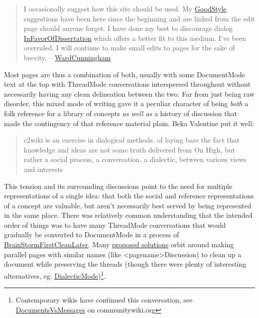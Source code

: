 \documentclass[10pt]{article}
\begin{document}
\begin{multicols}{2}
\begin{quote}
I occasionally suggest how this site should be used. My
\href{http://wiki.c2.com/?GoodStyle}{GoodStyle} suggestions have been
here since the beginning and are linked from the edit page should anyone
forget. I have done my best to discourage dialog
\href{http://wiki.c2.com/?InFavorOfDissertation}{InFavorOfDissertation}
which offers a better fit to this medium. I've been overruled. I will
continue to make small edits to pages for the sake of brevity. --
\href{http://wiki.c2.com/?WardCunningham}{WardCunningham} \cite{C2wikiWikiHistory} 
\end{quote}

Most pages are thus a combination of both, usually with some
DocumentMode text at the top with ThreadMode conversations interspersed
throughout without necessarily having any clean delineation between the
two. Far from just being raw disorder, this mixed mode of writing gave
it a peculiar character of being \emph{both} a folk reference for a
library of concepts \emph{as well as} a history of discussion that made
the contingency of that reference material plain. Beka Valentine put it
well:

\begin{quote}
c2wiki is an exercise in dialogical methods. of laying bare the fact
that knowledge and ideas are not some truth delivered from On High, but
rather a social process, a conversation, a dialectic, between various
views and interests \cite{valentineC2wikiExerciseDialogical2021} 
\end{quote}

This tension and its surrounding discussions point to the need for
multiple representations of a single idea: that both the social and
reference representations of a concept are valuable, but aren't
necessarily best served by being represented in the same place. There
was relatively common understanding that the intended order of things
was to have many ThreadMode conversations that would gradually be
converted to DocumentMode in a process of
\href{http://wiki.c2.com/?BrainStormFirstCleanLater}{BrainStormFirstCleanLater}.
Many \href{http://wiki.c2.com/?ConvertThreadModeToDocumentMode}{proposed
solutions} orbit around making parallel pages with similar names (like
\textless pagename\textgreater Discussion) to clean up a document while
preserving the threads (though there were plenty of interesting
alternatives, eg.
\href{http://wiki.c2.com/?DialecticMode}{DialecticMode})\footnote{Contemporary
  wikis have continued this conversation, see
  \href{https://communitywiki.org/wiki/DocumentsVsMessages}{DocumentsVsMessages}
  on communitywiki.org}.


\end{multicols}
\end{document}
